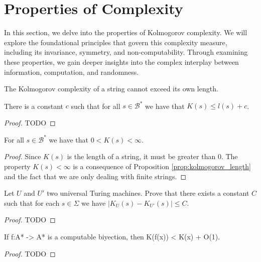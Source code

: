%
%

\section{Properties of Complexity}

In this section, we delve into the properties of Kolmogorov complexity. We will explore the foundational principles that govern this complexity measure, including its invariance, symmetry, and non-computability. Through examining these properties, we gain deeper insights into the complex interplay between information, computation, and randomness.

The Kolmogorov complexity of a string cannot exceed its own length.

\begin{proposition}
\label{prop:kolmogorov_length}
There is a constant $c$ such that for all $s\in\mathcal{B}^{\ast}$ we have that $K(s) \leq l(s)+c$.
\end{proposition}
\begin{proof}
{\color{red} TODO}
\end{proof}

\begin{proposition}
For all $s\in\mathcal{B}^{\ast}$ we have that $0 < K(s) < \infty$.
\end{proposition}
\begin{proof}
Since $K(s)$ is the length of a string, it must be greater than $0$. The property $K(s) < \infty$ is a consequence of Proposition \ref{prop:kolmogorov_length} and the fact that we are only dealing with finite strings.
\end{proof}


\begin{proposition}
Let $U$ and $U'$ two universal Turing machines. Prove that there exists a constant $C$ such that for each $s \in \Sigma$ we have $\mid K_{U}(s) - K_{U'}(s) \mid \leq C$.
\end{proposition}
\begin{proof}
{\color{red} TODO}
\end{proof}

\begin{proposition}
If f:A* -> A* is a computable biyection, then K(f(x)) < K(x) + O(1).
\end{proposition}
\begin{proof}
{\color{red} TODO}
\end{proof}


